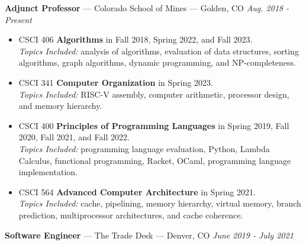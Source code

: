 \documentclass[10pt,letterpaper]{article}
\begin{document}
\textbf{Adjunct Professor} --- Colorado School of Mines --- Golden, CO
\hfill \textit{Aug. 2018 - Present}
\begin{itemize}
    \item CSCI 406 \textbf{Algorithms} in Fall 2018, Spring 2022, and Fall 2023. \\
        \textit{Topics Included:} analysis of algorithms, evaluation of data
        structures, sorting algorithms, graph algorithms, dynamic programming,
        and NP-completeness.
    \item CSCI 341 \textbf{Computer Organization} in Spring 2023. \\
        \textit{Topics Included:} RISC-V assembly, computer arithmetic, processor
        design, and memory hierarchy.
    \item CSCI 400 \textbf{Principles of Programming Languages} in Spring
        2019, Fall 2020, Fall 2021, and Fall 2022. \\
        \textit{Topics Included:} programming language evaluation, Python,
        Lambda Calculus, functional programming, Racket, OCaml, programming
        language implementation.
    \item CSCI 564 \textbf{Advanced Computer Architecture} in Spring 2021. \\
        \textit{Topics Included:} cache, pipelining, memory hierarchy, virtual
        memory, branch prediction, multiprocessor architectures, and cache
        coherence.
\end{itemize}

\textbf{Software Engineer} --- The Trade Desk --- Denver, CO
\hfill \textit{June 2019 - July 2021}



\end{document}
